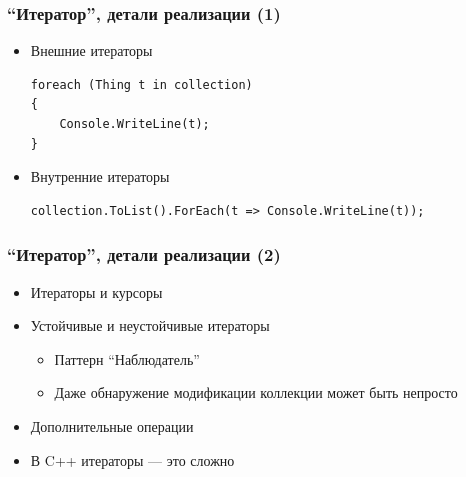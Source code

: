 \documentclass[xetex,mathserif,serif]{beamer}
\begin{document}
	\begin{frame}[fragile]
		\frametitle{``Итератор'', детали реализации (1)}
		\begin{itemize}
			\item Внешние итераторы
			\begin{verbatim}
foreach (Thing t in collection)
{
    Console.WriteLine(t);
} 
			\end{verbatim}
			\item Внутренние итераторы
			\begin{verbatim}
collection.ToList().ForEach(t => Console.WriteLine(t));
			\end{verbatim}
		\end{itemize}
\end{frame}

	\begin{frame}
		\frametitle{``Итератор'', детали реализации (2)}
		\begin{itemize}
			\item Итераторы и курсоры
			\item Устойчивые и неустойчивые итераторы
			\begin{itemize}
				\item Паттерн ``Наблюдатель''
				\item Даже обнаружение модификации коллекции может быть непросто
			\end{itemize}
			\item Дополнительные операции
			\item В C++ итераторы --- это сложно
		\end{itemize}
	\end{frame}
\end{document}
